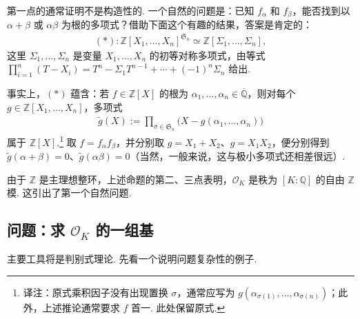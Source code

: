 \begin{remark*}

第一点的通常证明不是构造性的. 一个自然的问题是：已知 $f_\alpha$ 和 $f_\beta$，能否找到以 $\alpha+\beta$ 或 $\alpha\beta$ 为根的多项式？借助下面这个有趣的结果，答案是肯定的：
\begin{align*}
(*)\colon\mathbb{Z}[X_1,\ldots,X_n]^{\mathfrak S_n}\simeq\mathbb{Z}[\Sigma_1,\ldots,\Sigma_n],
\end{align*}
这里 $\Sigma_1,\ldots,\Sigma_n$ 是变量 $X_1,\ldots,X_n$ 的初等对称多项式，由等式 $\prod_{i=1}^n(T-X_i)=T^n-\Sigma_1T^{n-1}+\cdots+(-1)^n\Sigma_n$ 给出.

事实上，$(*)$ 蕴含：若 $f\in\mathbb{Z}[X]$ 的根为 $\alpha_1,\ldots,\alpha_n\in\overline{\mathbb{Q}}$，则对每个 $g\in\mathbb{Z}[X_1,\ldots,X_n]$，多项式
\begin{align*}
\widetilde g(X):=\prod_{\sigma\in\mathfrak S_n}\bigl(X-g(\alpha_1,\ldots,\alpha_n)\bigr)
\end{align*}
属于 $\mathbb{Z}[X]$.\footnote{译注：原式乘积因子没有出现置换 $\sigma$，通常应写为 $g(\alpha_{\sigma(1)},\ldots,\alpha_{\sigma(n)})$；此外，上述推论通常要求 $f$ 首一. 此处保留原式.} 取 $f=f_\alpha f_\beta$，并分别取 $g=X_1+X_2$、$g=X_1X_2$，便分别得到 $\widetilde g(\alpha+\beta)=0$、$\widetilde g(\alpha\beta)=0$（当然，一般来说，这与极小多项式还相差很远）.

\end{remark*}

由于 $\mathbb{Z}$ 是主理想整环，上述命题的第二、三点表明，$\mathcal O_K$ 是秩为 $[K:\mathbb{Q}]$ 的自由 $\mathbb{Z}$ 模. 这引出了第一个自然问题.

\subsection{问题：求 $\mathcal O_K$ 的一组基}\label{sec:nt-1-2-2}

主要工具将是判别式理论. 先看一个说明问题复杂性的例子.

